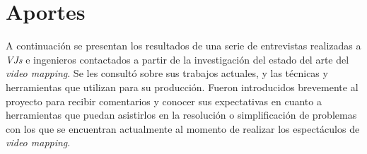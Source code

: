 ﻿\chapter{Aportes}
\label{chapter:aportes}
A continuación se presentan los resultados de una serie de entrevistas realizadas a \emph{VJs} e ingenieros contactados a partir de la investigación del estado del arte del \emph{video mapping}. Se les consultó sobre sus trabajos actuales, y las técnicas y herramientas que utilizan para su producción.
Fueron introducidos brevemente al proyecto para recibir comentarios y conocer sus expectativas en cuanto a herramientas que puedan asistirlos en la resolución o simplificación de problemas con los que se encuentran actualmente al momento de realizar los espectáculos de \emph{video mapping}.


